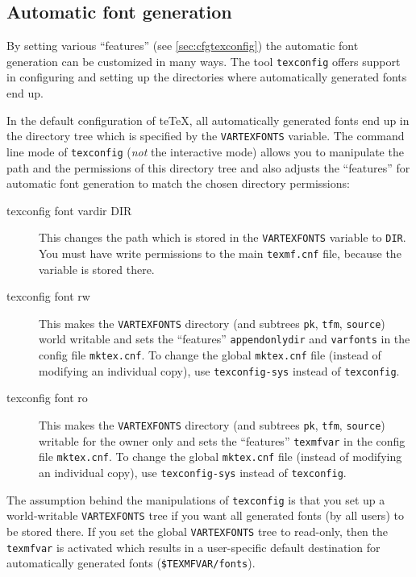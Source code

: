 \documentclass[11pt,a4paper]{article}
\begin{document}
\subsection{Automatic font generation}
By setting various ``features'' (see \ref{sec:cfgtexconfig}) the
automatic font generation can be customized in many ways.  The tool
\verb+texconfig+ offers support in configuring and setting up the
directories where automatically generated fonts end up.

In the default configuration of te\TeX, all automatically generated
fonts end up in the directory tree which is specified by the
\verb+VARTEXFONTS+ variable. The command line mode of \verb+texconfig+
(\emph{not} the interactive mode) allows you to manipulate the path
and the permissions of this directory tree and also adjusts the
``features'' for automatic font generation to match the chosen
directory permissions:

\begin{description}
\item [texconfig font vardir DIR] This changes the path which is
  stored in the \verb+VARTEXFONTS+ variable to \verb+DIR+. You must
  have write permissions to the main \verb+texmf.cnf+ file, because
  the variable is stored there.
\item [texconfig font rw] This makes the \verb+VARTEXFONTS+ directory
  (and subtrees \verb+pk+, \verb+tfm+, \verb+source+) world writable
  and sets the ``features'' \verb+appendonlydir+ and \verb+varfonts+
  in the config file \verb+mktex.cnf+. To change the global
  \verb+mktex.cnf+ file (instead of modifying an individual copy), use
  \verb+texconfig-sys+ instead of \verb+texconfig+.
\item [texconfig font ro] This makes the \verb+VARTEXFONTS+ directory
  (and subtrees \verb+pk+, \verb+tfm+, \verb+source+) writable for the
  owner only and sets the ``features'' \verb+texmfvar+ in the config
  file \verb+mktex.cnf+. To change the global \verb+mktex.cnf+ file
  (instead of modifying an individual copy), use \verb+texconfig-sys+
  instead of \verb+texconfig+.
\end{description}

The assumption behind the manipulations of \verb+texconfig+ is that
you set up a world-writable \verb+VARTEXFONTS+ tree if you want all
generated fonts (by all users) to be stored there. If you set the
global \verb+VARTEXFONTS+ tree to read-only, then the \verb+texmfvar+
is activated which results in a user-specific default destination for
automatically generated fonts (\verb+$TEXMFVAR/fonts+). %
\end{document}
